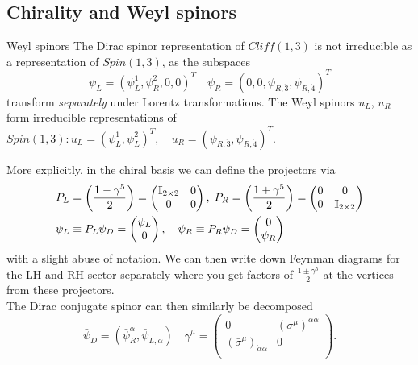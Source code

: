\subsection{Chirality and Weyl spinors}
\begin{mybox}{Weyl spinors}
	The Dirac spinor representation  of $Cliff(1,3)$ is not irreducible as a representation of $Spin(1,3)$, as the subspaces 
\begin{equation}
	\psi_L = (\psi^1_L,\psi^2_R,0,0)^T \quad \psi_R = (0,0,\psi_{R,\dot{3}},\psi_{R,\dot{4}})^T
\end{equation}
transform \emph{separately} under Lorentz transformations. The Weyl spinors $u_L$, $u_R$ form irreducible representations of $Spin(1,3): u_L=(\psi^1_L,\psi^2_L)^T, \quad u_R=(\psi_{R,\dot{3}},\psi_{R,\dot{4}})^T$.\\
\end{mybox}
More explicitly, in the chiral basis we can define the projectors via
\begin{align*}
	P_L&= \left(\frac{1-\gamma^5}{2}\right)=\begin{pmatrix}
		\mathbb{I}_{2\times 2}&0 \\
		0&0\\
	\end{pmatrix},\; P_R = \left(\frac{1 +\gamma^5}{2}\right) = \begin{pmatrix}
	0&0 \\
	0&\mathbb{I}_{2\times 2}\\
\end{pmatrix}\\
\psi_L & \equiv P_L \psi_D = \begin{pmatrix}
	\psi_L\\
	0\\
\end{pmatrix},\quad 
\psi_R \equiv P_R \psi_D = \begin{pmatrix}
	0\\
	\psi_R\\
\end{pmatrix}
\end{align*}
with a slight abuse of notation. We can then write down Feynman diagrams for the LH and RH sector separately where you get factors of $\frac{1\pm \gamma^5}{2}$ at the vertices from these projectors.\\
The Dirac conjugate spinor can then similarly be decomposed
\begin{equation}
	\bar{ \psi}_D = (\bar{\psi}^\alpha_R,\bar{\psi}_{L,\dot{\alpha}} )\quad \gamma^\mu = \begin{pmatrix}
	0&(\sigma^\mu)^{\alpha \dot{\alpha}}\\
	(\bar{ \sigma}^\mu)_{\dot{\alpha}\alpha} &0\\
	\end{pmatrix}.
\end{equation}
